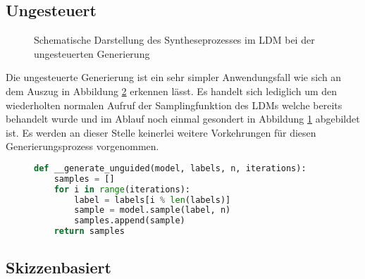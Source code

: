 \subsection {Ungesteuert}

\begin{figure}[htbp]
    \centering
    \caption{Schematische Darstellung des Syntheseprozesses im \ac{LDM} bei der ungesteuerten Generierung}
    \label{fig:unguided}
\end{figure}
Die ungesteuerte Generierung ist ein sehr simpler Anwendungsfall wie sich an dem Auszug in Abbildung \ref{fig:gen_unguided} erkennen lässt. Es handelt sich lediglich um den wiederholten normalen Aufruf der Samplingfunktion des \ac{LDM}s welche bereits behandelt wurde und im Ablauf noch einmal gesondert in Abbildung \ref{fig:unguided} abgebildet ist. Es werden an dieser Stelle keinerlei weitere Vorkehrungen für diesen Generierungsprozess vorgenommen.   
\begin{figure}[htbp]
\begin{lstlisting}[language=python]
def __generate_unguided(model, labels, n, iterations):
    samples = []
    for i in range(iterations):
        label = labels[i % len(labels)]
        sample = model.sample(label, n)
        samples.append(sample)
    return samples
\end{lstlisting}
    \captionsetup{type=figure}
    \label{fig:gen_unguided}
\end{figure}

\subsection {Skizzenbasiert}

